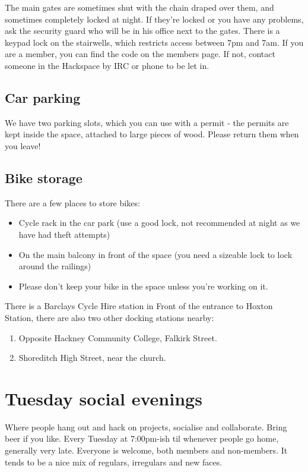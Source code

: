 \documentclass[12pt,a4paper]{book}
\begin{document}
The main gates are sometimes shut with the chain draped over them, and sometimes completely locked at night. If they're locked or you have any problems, ask the security guard who will be in his office next to the gates. There is a keypad lock on the stairwells, which restricts access between 7pm and 7am. If you are a member, you can find the code on the members page. If not, contact someone in the Hackspace by IRC or phone to be let in.

\subsection{Car parking}

We have two parking slots, which you can use with a permit - the permits are kept inside the space, attached to large pieces of wood. Please return them when you leave!

\subsection{Bike storage}

There are a few places to store bikes:

\begin{itemize}
	\item Cycle rack in the car park (use a good lock, not recommended at night as we have had theft attempts)
	\item On the main balcony in front of the space (you need a sizeable lock to lock around the railings)
	\item Please don't keep your bike in the space unless you're working on it.
\end{itemize}

There is a Barclays Cycle Hire station in Front of the entrance to Hoxton Station, there are also two other docking stations nearby:

\begin{enumerate}
	\item Opposite Hackney Community College, Falkirk Street.
	\item Shoreditch High Street, near the church.
\end{enumerate}


\section{Tuesday social evenings}

Where people hang out and hack on projects, socialise and collaborate. Bring beer if you like. Every Tuesday at 7:00pm-ish til whenever people go home, generally very late. Everyone is welcome, both members and non-members. It tends to be a nice mix of regulars, irregulars and new faces.
\end{document}
